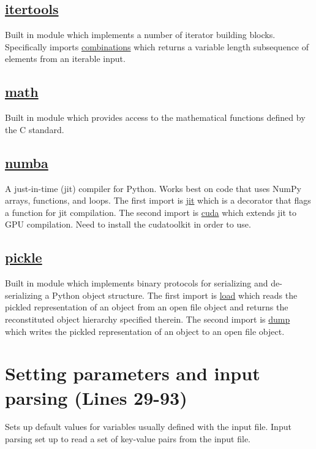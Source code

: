 \documentclass[12pt]{article}
\begin{document}
\subsection*{\href{https://docs.python.org/3/library/itertools.html}{itertools}}
Built in module which implements a number of iterator building blocks. Specifically imports \href{https://docs.python.org/3/library/itertools.html#itertools.combinations}{combinations} which returns a variable length subsequence of elements from an iterable input. 

\subsection*{\href{https://docs.python.org/3/library/math.html}{math}}
Built in module which provides access to the mathematical functions defined by the C standard.

\subsection*{\href{https://numba.readthedocs.io/en/stable/index.html}{numba}}
A just-in-time (jit) compiler for Python. Works best on code that uses NumPy arrays, functions, and loops. The first import is \href{https://numba.pydata.org/numba-doc/latest/user/jit.html}{jit} which is a decorator that flags a function for jit compilation. The second import is \href{https://numba.pydata.org/numba-doc/latest/cuda/index.html}{cuda} which extends jit to GPU compilation. Need to install the cudatoolkit in order to use. 

\subsection*{\href{https://docs.python.org/3/library/pickle.html}{pickle}}
Built in module which implements binary protocols for serializing and de-serializing a Python object structure. The first import is \href{https://docs.python.org/3/library/pickle.html?highlight=load#pickle.load}{load} which reads the pickled representation of an object from an open file object and returns the reconstituted object hierarchy specified therein. The second import is \href{https://docs.python.org/3/library/pickle.html?highlight=load#pickle.dump}{dump} which writes the pickled representation of an object to an open file object. 

\section*{Setting parameters and input parsing (Lines 29-93)}
Sets up default values for variables usually defined with the input file. Input parsing set up to read a set of key-value pairs from the input file. 
\end{document}
